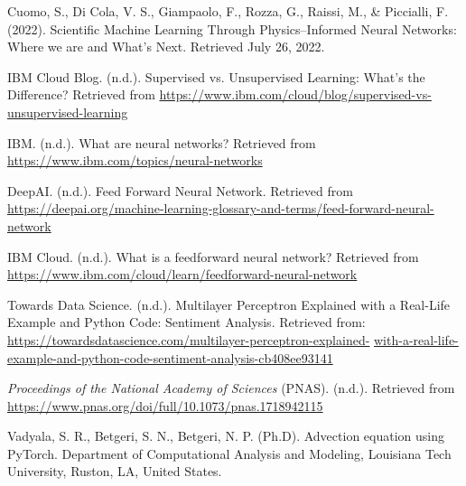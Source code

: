 \documentclass{article}
\begin{document}
\begin{thebibliography}{9}

     Cuomo, S., Di Cola, V. S., Giampaolo, F., Rozza, G., Raissi, M., \& Piccialli, F. (2022). Scientific Machine Learning Through Physics–Informed Neural Networks: Where we are and What’s Next. Retrieved July 26, 2022.
    
     IBM Cloud Blog. (n.d.). Supervised vs. Unsupervised Learning: What’s the Difference? Retrieved from \url{https://www.ibm.com/cloud/blog/supervised-vs-unsupervised-learning}
    
     IBM. (n.d.). What are neural networks? Retrieved from \url{https://www.ibm.com/topics/neural-networks}
    
     DeepAI. (n.d.). Feed Forward Neural Network. Retrieved from \url{https://deepai.org/machine-learning-glossary-and-terms/feed-forward-neural-network}
    
     IBM Cloud. (n.d.). What is a feedforward neural network? Retrieved from \url{https://www.ibm.com/cloud/learn/feedforward-neural-network}
    
     Towards Data Science. (n.d.). Multilayer Perceptron Explained with a Real-Life Example and Python Code: Sentiment Analysis. Retrieved from: \newline
    \url{https://towardsdatascience.com/multilayer-perceptron-explained-} \url{
    with-a-real-life-example-and-python-code-sentiment-analysis-cb408ee93141}
    
     \textit{Proceedings of the National Academy of Sciences} (PNAS). (n.d.). Retrieved from \url{https://www.pnas.org/doi/full/10.1073/pnas.1718942115}
    
     Vadyala, S. R., Betgeri, S. N., Betgeri, N. P. (Ph.D). Advection equation using PyTorch. Department of Computational Analysis and Modeling, Louisiana Tech University, Ruston, LA, United States.

\end{thebibliography}
\end{document}
